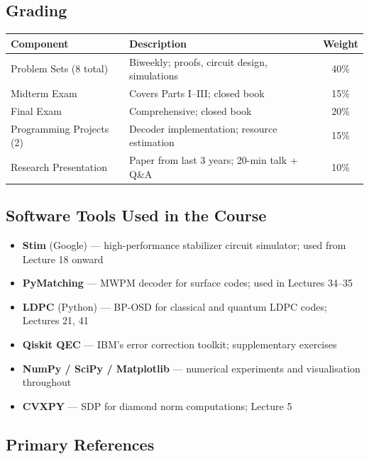 \documentclass[12pt,oneside]{article}
\begin{document}
\subsection*{Grading}
\begin{center}
\begin{tabular}{llc}
  \toprule
  \textbf{Component} & \textbf{Description} & \textbf{Weight} \\
  \midrule
  Problem Sets (8 total)     & Biweekly; proofs, circuit design, simulations & 40\% \\
  Midterm Exam               & Covers Parts I--III; closed book                & 15\% \\
  Final Exam                 & Comprehensive; closed book                      & 20\% \\
  Programming Projects (2)   & Decoder implementation; resource estimation     & 15\% \\
  Research Presentation      & Paper from last 3 years; 20-min talk + Q\&A     & 10\% \\
  \bottomrule
\end{tabular}
\end{center}

\subsection*{Software Tools Used in the Course}
\begin{itemize}[itemsep=3pt]
  \item \textbf{Stim} (Google) --- high-performance stabilizer circuit simulator; used from Lecture 18 onward
  \item \textbf{PyMatching} --- MWPM decoder for surface codes; used in Lectures 34--35
  \item \textbf{LDPC} (Python) --- BP-OSD for classical and quantum LDPC codes; Lectures 21, 41
  \item \textbf{Qiskit QEC} --- IBM's error correction toolkit; supplementary exercises
  \item \textbf{NumPy / SciPy / Matplotlib} --- numerical experiments and visualisation throughout
  \item \textbf{CVXPY} --- SDP for diamond norm computations; Lecture 5
\end{itemize}

\subsection*{Primary References}
\end{document}

